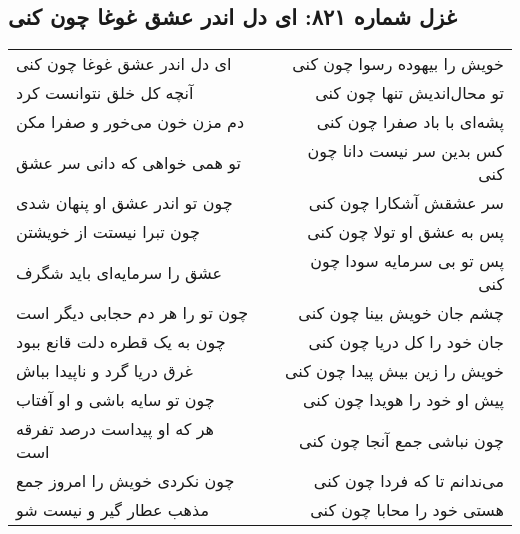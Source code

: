 \begin{center}
\section*{غزل شماره ۸۲۱: ای دل اندر عشق غوغا چون کنی}
\label{sec:821}
\begin{longtable}{l p{0.5cm} r}
ای دل اندر عشق غوغا چون کنی
&&
خویش را بیهوده رسوا چون کنی
\\
آنچه کل خلق نتوانست کرد
&&
تو محال‌اندیش تنها چون کنی
\\
دم مزن خون می‌خور و صفرا مکن
&&
پشه‌ای با باد صفرا چون کنی
\\
تو همی خواهی که دانی سر عشق
&&
کس بدین سر نیست دانا چون کنی
\\
چون تو اندر عشق او پنهان شدی
&&
سر عشقش آشکارا چون کنی
\\
چون تبرا نیستت از خویشتن
&&
پس به عشق او تولا چون کنی
\\
عشق را سرمایه‌ای باید شگرف
&&
پس تو بی سرمایه سودا چون کنی
\\
چون تو را هر دم حجابی دیگر است
&&
چشم جان خویش بینا چون کنی
\\
چون به یک قطره دلت قانع ببود
&&
جان خود را کل دریا چون کنی
\\
غرق دریا گرد و ناپیدا بباش
&&
خویش را زین بیش پیدا چون کنی
\\
چون تو سایه باشی و او آفتاب
&&
پیش او خود را هویدا چون کنی
\\
هر که او پیداست درصد تفرقه است
&&
چون نباشی جمع آنجا چون کنی
\\
چون نکردی خویش را امروز جمع
&&
می‌ندانم تا که فردا چون کنی
\\
مذهب عطار گیر و نیست شو
&&
هستی خود را محابا چون کنی
\\
\end{longtable}
\end{center}
